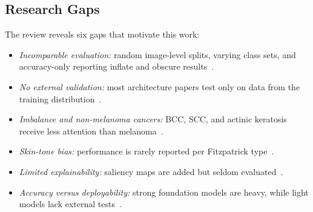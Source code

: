 \subsection{Research Gaps}
The review reveals six gaps that motivate this work:
\begin{itemize}[leftmargin=2.4em,labelsep=0.4em]
  \item[\textbf{G1}] \emph{Incomparable evaluation:} random image-level
        splits, varying class sets, and accuracy-only reporting inflate
        and obscure results~\cite{cassidy2022isic}.
  \item[\textbf{G2}] \emph{No external validation:} most architecture
        papers test only on data from the training
        distribution~\cite{karthik2024,naeem2025}.
  \item[\textbf{G3}] \emph{Imbalance and non-melanoma cancers:} BCC,
        SCC, and actinic keratosis receive less attention than
        melanoma~\cite{jones2022}.
  \item[\textbf{G4}] \emph{Skin-tone bias:} performance is rarely
        reported per Fitzpatrick type~\cite{wen2022,daneshjou2022ddi}.
  \item[\textbf{G5}] \emph{Limited explainability:} saliency maps are
        added but seldom evaluated~\cite{hauser2022}.
  \item[\textbf{G6}] \emph{Accuracy versus deployability:} strong
        foundation models are heavy, while light models lack external
        tests~\cite{yan2025panderm,ding2023}.
\end{itemize}

